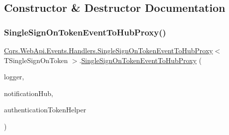 \subsection{Constructor \& Destructor Documentation}
\mbox{\label{classCqrs_1_1WebApi_1_1Events_1_1Handlers_1_1SingleSignOnTokenEventToHubProxy_ad54ad4efb19787dbf07287bf1fa7816b}} 
\subsubsection{\texorpdfstring{Single\+Sign\+On\+Token\+Event\+To\+Hub\+Proxy()}{SingleSignOnTokenEventToHubProxy()}}
{\footnotesize\ttfamily \hyperlink{classCqrs_1_1WebApi_1_1Events_1_1Handlers_1_1SingleSignOnTokenEventToHubProxy}{Cqrs.\+Web\+Api.\+Events.\+Handlers.\+Single\+Sign\+On\+Token\+Event\+To\+Hub\+Proxy}$<$ T\+Single\+Sign\+On\+Token $>$.\hyperlink{classCqrs_1_1WebApi_1_1Events_1_1Handlers_1_1SingleSignOnTokenEventToHubProxy}{Single\+Sign\+On\+Token\+Event\+To\+Hub\+Proxy} (\begin{DoxyParamCaption}\item[{I\+Logger}]{logger,  }\item[{\hyperlink{interfaceCqrs_1_1WebApi_1_1SignalR_1_1Hubs_1_1INotificationHub}{I\+Notification\+Hub}}]{notification\+Hub,  }\item[{\hyperlink{interfaceCqrs_1_1Authentication_1_1IAuthenticationTokenHelper}{I\+Authentication\+Token\+Helper}$<$ T\+Single\+Sign\+On\+Token $>$}]{authentication\+Token\+Helper }\end{DoxyParamCaption})\hspace{0.3cm}{\ttfamily [protected]}}



